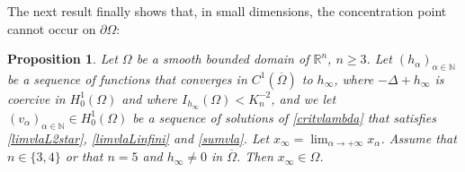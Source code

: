 \documentclass[10pt]{amsart}
\numberwithin{equation}{section}
\newcommand{\Om}{\Omega}
\def \rr {\mathbb{R}}
\def \va{v_{\alpha}}
\def \ha{h_{\alpha}}
\def \hi{h_{\infty}}
\def \nn{\mathbb{N}}
\theoremstyle{plain}
\newtheorem{prop}{Proposition}[section]%
\theoremstyle{remark}
\begin{document}
The next result finally shows that, in small dimensions, the concentration point cannot occur on $\partial \Om$:


\begin{prop} \label{prop:blowup:bord3}
Let $\Om$ be a smooth bounded domain of $\rr^n$, $n\geq 3$. Let $(\ha)_{\alpha\in\nn}$ be a sequence of functions that converges in $C^{1}(\overline{\Om})$ to $\hi$, where $-\Delta+\hi$ is coercive in $H^1_0(\Om)$ and where $I_{\hi}(\Om)<K_{n}^{-2}$, and we let $(\va)_{\alpha\in\nn}\in H_0^1(\Om)$ be a sequence of solutions of \eqref{critvlambda} that satisfies \eqref{limvlaL2star}, \eqref{limvlaLinfini} and \eqref{sumvla}. Let $x_\infty = \lim_{\alpha \to + \infty} x_\alpha$. Assume that $n\in\{3,4\}$ or that $n =5$ and $h_\infty \neq 0$ in $\overline{\Om}$. Then  $x_\infty \in \Om$. 
\end{prop}
\end{document}
